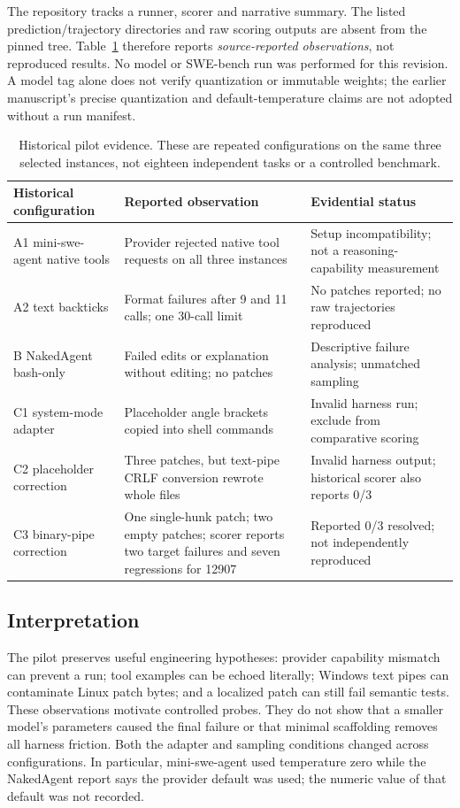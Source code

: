 \documentclass[10pt,twocolumn,letterpaper]{article}
\begin{document}
The repository tracks a runner, scorer and narrative summary. The listed prediction/trajectory directories and raw scoring outputs are absent from the pinned tree. Table~\ref{tab:pilot} therefore reports \emph{source-reported observations}, not reproduced results. No model or SWE-bench run was performed for this revision. A model tag alone does not verify quantization or immutable weights; the earlier manuscript's precise quantization and default-temperature claims are not adopted without a run manifest.

\begin{table}[t]
\centering\small
\begin{tabular}{p{}p{}p{}}
\toprule
Historical configuration & Reported observation & Evidential status \\
\midrule
A1 mini-swe-agent native tools & Provider rejected native tool requests on all three instances & Setup incompatibility; not a reasoning-capability measurement \\
A2 text backticks & Format failures after 9 and 11 calls; one 30-call limit & No patches reported; no raw trajectories reproduced \\
B NakedAgent bash-only & Failed edits or explanation without editing; no patches & Descriptive failure analysis; unmatched sampling \\
C1 system-mode adapter & Placeholder angle brackets copied into shell commands & Invalid harness run; exclude from comparative scoring \\
C2 placeholder correction & Three patches, but text-pipe CRLF conversion rewrote whole files & Invalid harness output; historical scorer also reports 0/3 \\
C3 binary-pipe correction & One single-hunk patch; two empty patches; scorer reports two target failures and seven regressions for 12907 & Reported 0/3 resolved; not independently reproduced \\
\bottomrule
\end{tabular}
\caption{Historical pilot evidence. These are repeated configurations on the same three selected instances, not eighteen independent tasks or a controlled benchmark.}
\label{tab:pilot}
\end{table}

\subsection{Interpretation}
The pilot preserves useful engineering hypotheses: provider capability mismatch can prevent a run; tool examples can be echoed literally; Windows text pipes can contaminate Linux patch bytes; and a localized patch can still fail semantic tests. These observations motivate controlled probes. They do not show that a smaller model's parameters caused the final failure or that minimal scaffolding removes all harness friction. Both the adapter and sampling conditions changed across configurations. In particular, mini-swe-agent used temperature zero while the NakedAgent report says the provider default was used; the numeric value of that default was not recorded.
\end{document}
